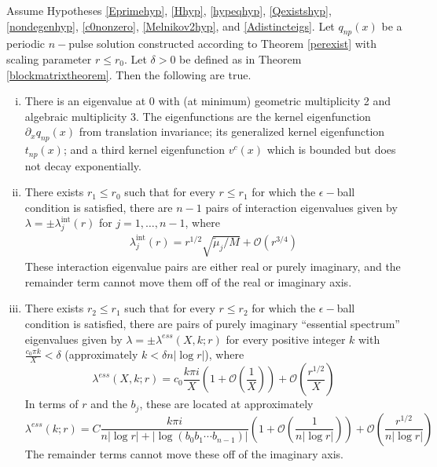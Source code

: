 \documentclass[thesis.tex]{subfiles}
\begin{document}

\begin{theorem}\label{locateeigtheorem}
Assume Hypotheses \ref{Eprimehyp}, \ref{Hhyp}, \ref{hypeqhyp}, \ref{Qexistshyp}, \ref{nondegenhyp}, \ref{c0nonzero}, \ref{Melnikov2hyp}, and \ref{Adistincteigs}. Let $q_{np}(x)$ be a periodic $n-$pulse solution constructed according to Theorem \ref{perexist} with scaling parameter $r \leq r_0$. Let $\delta > 0$ be defined as in Theorem \ref{blockmatrixtheorem}. Then the following are true.

\begin{enumerate}[(i)]

\item There is an eigenvalue at 0 with (at minimum) geometric multiplicity 2 and algebraic multiplicity 3. The eigenfunctions are the kernel eigenfunction $\partial_x q_{np}(x)$ from translation invariance; its generalized kernel eigenfunction $t_{np}(x)$; and a third kernel eigenfunction $v^c(x)$ which is bounded but does not decay exponentially.

\item There exists $r_1 \leq r_0$ such that for every $r \leq r_1$ for which the $\epsilon-$ball condition is satisfied, there are $n - 1$ pairs of interaction eigenvalues given by $\lambda = \pm \lambda^{\text{int}}_j(r)$ for $j = 1, \dots, n-1$, where
\begin{align*}
\lambda^{\text{int}}_j(r) = r^{1/2} \sqrt{\tilde{\mu}_j / M} + \mathcal{O}(r^{3/4})
\end{align*}
These interaction eigenvalue pairs are either real or purely imaginary, and the remainder term cannot move them off of the real or imaginary axis.

\item There exists $r_2 \leq r_1$ such that for every $r \leq r_2$ for which the $\epsilon-$ball condition is satisfied, there are pairs of purely imaginary ``essential spectrum'' eigenvalues given by $\lambda = \pm \lambda^{ess}(X,k; r)$ for every positive integer $k$ with $\frac{c_0 \pi k}{X} < \delta$ (approximately $k < \delta n |\log r|$), where
\begin{equation}\label{lambdaess}
\lambda^{ess}(X, k; r) = c_0 \frac{k \pi i }{X} \left( 1 + \mathcal{O}\left( \frac{1}{X} \right)\right) + \mathcal{O}\left( \frac{r^{1/2}}{X} \right)
\end{equation}
In terms of $r$ and the $b_j$, these are located at approximately
\begin{equation}\label{lambdaessr}
\lambda^{ess}(k; r) = C \frac{k \pi i }{n |\log r| + |\log (b_0 b_1 \cdots b_{n-1})|}  \left( 1 + \mathcal{O}\left( \frac{1}{n |\log r|} \right)\right) + \mathcal{O}\left( \frac{r^{1/2}}{n |\log r|} \right)
\end{equation}
The remainder terms cannot move these off of the imaginary axis.


\end{enumerate}
\end{theorem}
\end{document}
